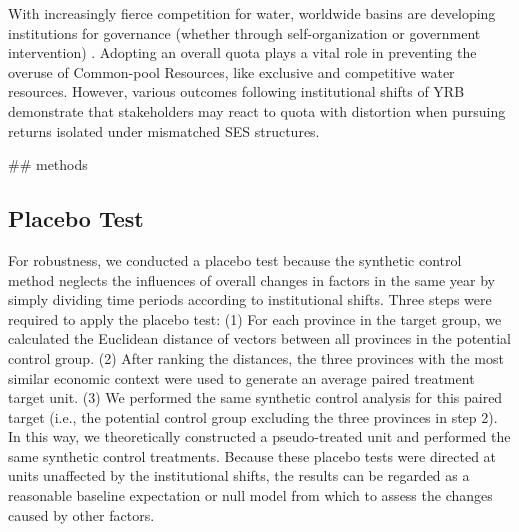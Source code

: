 With increasingly fierce competition for water, worldwide basins are developing institutions for governance (whether through self-organization or government intervention) \cite{andersson2020, wutich2009, cumming2020b}.
Adopting an overall quota plays a vital role in preventing the overuse of Common-pool Resources, like exclusive and competitive water resources.
However, various outcomes following institutional shifts of YRB demonstrate that stakeholders may react to quota with distortion when pursuing returns isolated under mismatched SES structures.


## methods
\subsection{Placebo Test}
For robustness, we conducted a placebo test because the synthetic control method neglects the influences of overall changes in factors in the same year by simply dividing time periods according to institutional shifts. Three steps were required to apply the placebo test:
(1) For each province in the target group, we calculated the Euclidean distance of vectors between all provinces in the potential control group.
(2) After ranking the distances, the three provinces with the most similar economic context were used to generate an average paired treatment target unit.
(3) We performed the same synthetic control analysis for this paired target (i.e., the potential control group excluding the three provinces in step 2).
In this way, we theoretically constructed a pseudo-treated unit and performed the same synthetic control treatments. Because these placebo tests were directed at units unaffected by the institutional shifts, the results can be regarded as a reasonable baseline expectation or null model from which to assess the changes caused by other factors.
